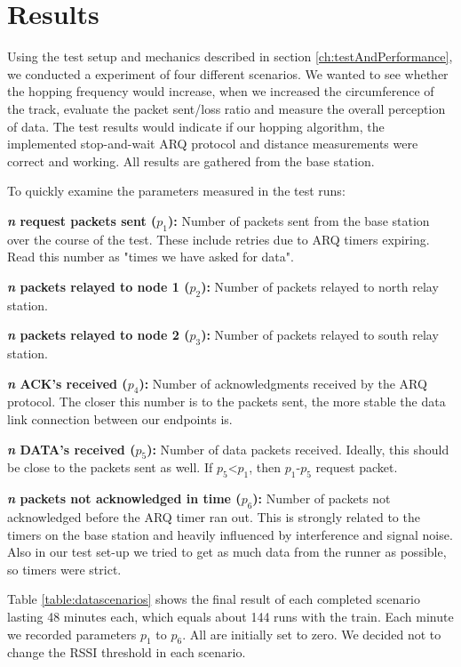 \chapter{Results}\label{ch:results}

Using the test setup and mechanics described in section \ref{ch:testAndPerformance}, we conducted a experiment of four different scenarios. We wanted to see whether the hopping frequency would increase, when we increased the circumference of the track, evaluate the packet sent/loss ratio and measure the overall perception of data. The test results would indicate if our hopping algorithm, the implemented stop-and-wait ARQ protocol and distance measurements were correct and working. All results are gathered from the base station.

\noindent To quickly examine the parameters measured in the test runs:

\noindent \textbf{\textit{n} request packets sent ($p_1$):} Number of packets sent from the base station over the course of the test. These include retries due to ARQ timers expiring. Read this number as "times we have asked for data".

\noindent \textbf{\textit{n} packets relayed to node 1 ($p_2$):} Number of packets relayed to north relay station.

\noindent \textbf{\textit{n} packets relayed to node 2 ($p_3$):} Number of packets relayed to south relay station.

\noindent \textbf{\textit{n} ACK's received ($p_4$):} Number of acknowledgments received by the ARQ protocol. The closer this number is to the packets sent, the more stable the data link connection between our endpoints is.

\noindent \textbf{\textit{n} DATA's received ($p_5$):} Number of data packets received. Ideally, this should be close to the packets sent as well. If $p_5$<$p_1$, then $p_1$-$p_5$ request packet.

\noindent \textbf{\textit{n} packets not acknowledged in time ($p_6$):} Number of packets not acknowledged before the ARQ timer ran out. This is strongly related to the timers on the base station and heavily influenced by interference and signal noise. Also in our test set-up we tried to get as much data from the runner as possible, so timers were strict.

\noindent Table \ref{table:datascenarios} shows the final result of each completed scenario lasting 48 minutes each, which equals about 144 runs with the train. Each minute we recorded parameters $p_1$ to $p_6$. All are initially set to zero. We decided not to change the RSSI threshold in each scenario.


